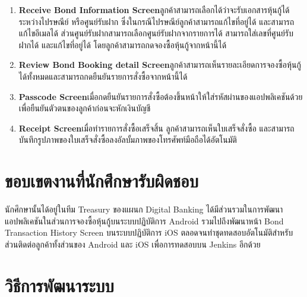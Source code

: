 \begin{enumerate}
    \item \textbf{Receive Bond Information Screen}\newline ลูกค้าสามารถเลือกได้ว่าจะรับเอกสารหุ้นกู้ได้ระหว่างไปรษณีย์ หรือศูนย์รับฝาก ซึ่งในกรณีไปรษณีย์ลูกค้าสามารถแก้ไขที่อยู่ได้ และสามารถแก้ไขอีเมลได้ ส่วนศูนย์รับฝากสามารถเลือกศูนย์รับฝากจากรายการได้ สามารถใส่เลขที่ศูนย์รับฝากได้ และแก้ไขที่อยู่ได้ โดยลูกค้าสามารถกดจองซื้อหุ้นกู้จากหน้านี้ได้
    \item \textbf{Review Bond Booking detail Screen}\newline ลูกค้าสามารถเห็นรายละเอียดการจองซื้อหุ้นกู้ได้ทั้งหมดและสามารถกดยืนยันรายการสั่งซื้อจากหน้านี้ได้
    \item \textbf{Passcode Screen}\newline เมื่อกดยืนยันรายการสั่งซื้อต้องขึ้นหน้าให้ใส่รหัสผ่านของแอปพลิเคชันด้วยเพื่อยืนยันตัวตนของลูกค้าก่อนจะหักเงินบัญชี
    \item \textbf{Receipt Screen}\newline เมื่อทำรายการสั่งซื้อเสร็จสิ้น ลูกค้าสามารถเห็นใบเสร็จสั่งซื้อ และสามารถบันทึกรูปภาพของใบเสร็จสั่งซื้อลงอัลบั้มภาพของโทรศัพท์มือถือได้อัตโนมัติ
\end{enumerate}

\newpage
\section{ขอบเขตงานที่นักศึกษารับผิดชอบ}
    นักศึกษานั้นได้อยู่ในทีม Treasury ของแผนก Digital Banking ได้มีส่วนรวมในการพัฒนาแอปพลิเคชันในส่วนการจองซื้อหุ้นกู้บนระบบปฏิบัติการ Android รวมไปถึงพัฒนาหน้า Bond Transaction History Screen 
    บนระบบปฏิบัติการ iOS ตลอดจนทำชุดทดสอบอัตโนมัติสำหรับส่วนติดต่อลูกค้าทั้งส่วนของ Android และ iOS เพื่อการทดสอบบน Jenkins อีกด้วย

\section{วิธีการพัฒนาระบบ}
